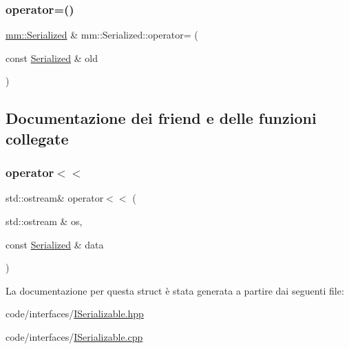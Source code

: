 \mbox{\label{structmm_1_1_serialized_a7d108150308172857962c61c94f78fbd}} 
\subsubsection{\texorpdfstring{operator=()}{operator=()}}
{\footnotesize\ttfamily \hyperlink{structmm_1_1_serialized}{mm\+::\+Serialized} \& mm\+::\+Serialized\+::operator= (\begin{DoxyParamCaption}\item[{const \hyperlink{structmm_1_1_serialized}{Serialized} \&}]{old }\end{DoxyParamCaption})}



\subsection{Documentazione dei friend e delle funzioni collegate}
\mbox{\label{structmm_1_1_serialized_a7ac660741c58dec6ffe85a006b9846ae}} 
\subsubsection{\texorpdfstring{operator$<$$<$}{operator<<}}
{\footnotesize\ttfamily std\+::ostream\& operator$<$$<$ (\begin{DoxyParamCaption}\item[{std\+::ostream \&}]{os,  }\item[{const \hyperlink{structmm_1_1_serialized}{Serialized} \&}]{data }\end{DoxyParamCaption})\hspace{0.3cm}{\ttfamily [friend]}}



La documentazione per questa struct è stata generata a partire dai seguenti file\+:\begin{DoxyCompactItemize}
\item 
code/interfaces/\hyperlink{_i_serializable_8hpp}{I\+Serializable.\+hpp}\item 
code/interfaces/\hyperlink{_i_serializable_8cpp}{I\+Serializable.\+cpp}\end{DoxyCompactItemize}
